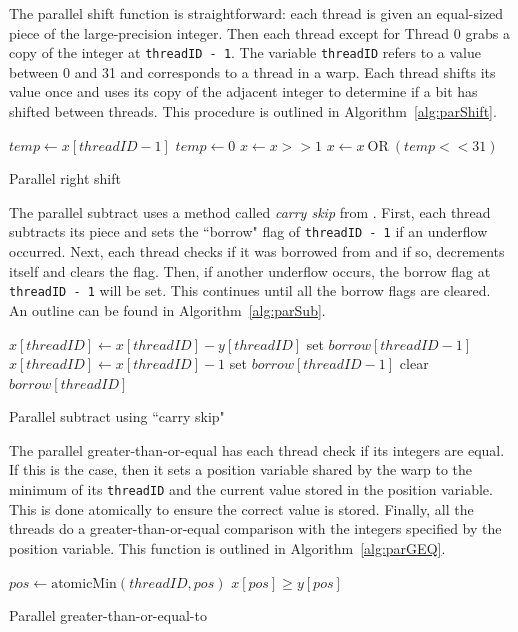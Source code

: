 \documentclass[smallextended]{svjour3}       %
\begin{document}
The parallel shift function is straightforward: each thread is given an 
equal-sized piece of the large-precision integer. Then each thread except for 
Thread 0 grabs a copy of the integer at \texttt{threadID  - 1}.
The variable \texttt{threadID} refers to a value between 0 and 31 and corresponds 
to a thread in a warp. Each thread shifts its value once and 
uses its copy of the adjacent integer to determine if a bit has shifted 
between threads. This procedure is outlined in Algorithm~\ref{alg:parShift}.
\begin{algorithm}
   \nl{} {
      \nl$temp\gets x[threadID - 1]$\;
   }{
      \nl$temp\gets 0$\;
   }
   \nl$x\gets x>>1$\;
   \nl$x\gets x \:\text{OR}\: (temp << 31)$\;
   \caption{Parallel right shift}
   \label{alg:parShift}
\end{algorithm}

The parallel subtract uses a method called \emph{carry skip} from 
\cite{fujimoto2009high}. First, each thread subtracts its piece and sets the 
``borrow" flag of \texttt{threadID - 1} if an underflow occurred. Next, each 
thread checks if it was borrowed from and if so, decrements itself and clears the 
flag. Then, if another underflow occurs, the borrow flag at
\texttt{threadID - 1} will be set. This continues until all the borrow flags
are cleared. An outline can be found in Algorithm~\ref{alg:parSub}.

\begin{algorithm}
   \nl$x[threadID]\gets x[threadID]-y[threadID]$\;
   \nl{} {
      \nl set $borrow[threadID - 1]$\;
   }
   \nl{} {
   \nl{} {
      \nl$x[threadID]\gets x[threadID] - 1$\;
         \nl{} {
            \nl set $borrow[threadID - 1]$\;
         }
         \nl clear $borrow[threadID]$\;
      }
   }
   \caption{Parallel subtract using ``carry skip"}
   \label{alg:parSub}
\end{algorithm}

The parallel greater-than-or-equal has each thread check if its integers are 
equal. If this is the case, then it sets a position variable shared by the warp 
to the minimum of its \texttt{threadID} and the current value stored in the position variable.
This is done atomically to ensure the correct value is stored. Finally, all 
the threads do a greater-than-or-equal comparison with the integers specified
by the position variable. This function is outlined in Algorithm~\ref{alg:parGEQ}.
\begin{algorithm}
   \nl{} {
      \nl$pos\gets \text{atomicMin}(threadID, pos)$\;
   }
   \nl\Return $x[pos] \geq y[pos]$
   \caption{Parallel greater-than-or-equal-to}
   \label{alg:parGEQ}
\end{algorithm}
\end{document}
